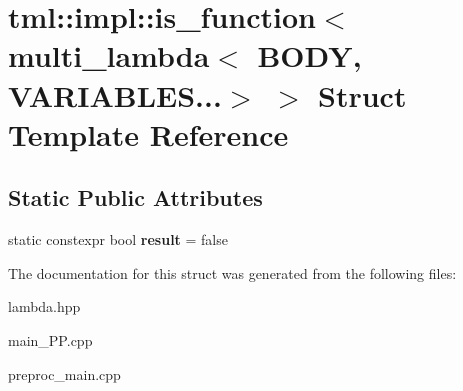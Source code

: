 \hypertarget{structtml_1_1impl_1_1is__function_3_01multi__lambda_3_01BODY_00_01VARIABLES_8_8_8_4_01_4}{\section{tml\+:\+:impl\+:\+:is\+\_\+function$<$ multi\+\_\+lambda$<$ B\+O\+D\+Y, V\+A\+R\+I\+A\+B\+L\+E\+S...$>$ $>$ Struct Template Reference}
\label{structtml_1_1impl_1_1is__function_3_01multi__lambda_3_01BODY_00_01VARIABLES_8_8_8_4_01_4}
}
\subsection*{Static Public Attributes}
\begin{DoxyCompactItemize}
\item 
\hypertarget{structtml_1_1impl_1_1is__function_3_01multi__lambda_3_01BODY_00_01VARIABLES_8_8_8_4_01_4_a8894369c5172574e8f3c9f824a93f7e6}{static constexpr bool {\bfseries result} = false}\label{structtml_1_1impl_1_1is__function_3_01multi__lambda_3_01BODY_00_01VARIABLES_8_8_8_4_01_4_a8894369c5172574e8f3c9f824a93f7e6}

\end{DoxyCompactItemize}


The documentation for this struct was generated from the following files\+:\begin{DoxyCompactItemize}
\item 
lambda.\+hpp\item 
main\+\_\+\+P\+P.\+cpp\item 
preproc\+\_\+main.\+cpp\end{DoxyCompactItemize}
